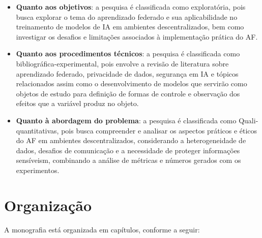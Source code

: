 \begin{itemize}
    \item \textbf{Quanto aos objetivos}: a pesquisa é classificada como exploratória, pois busca explorar o tema do aprendizado federado e sua aplicabilidade no treinamento de modelos de IA em ambientes descentralizados, bem como investigar os desafios e limitações associados à implementação prática do AF.
    \item \textbf{Quanto aos procedimentos técnicos}: a pesquisa é classificada como bibliográfica-experimental, pois envolve a revisão de literatura sobre aprendizado federado, privacidade de dados, segurança em IA e tópicos relacionados assim como o desenvolvimento de modelos que servirão como objetos de estudo para definição de formas de controle e observação dos efeitos que a variável produz no objeto.
    \item \textbf{Quanto à abordagem do problema}: a pesquisa é classificada como Quali-quantitativas, pois busca compreender e analisar os aspectos práticos e éticos do AF em ambientes descentralizados, considerando a heterogeneidade de dados, desafios de comunicação e a necessidade de proteger informações sensíveism, combinando a análise de métricas e números gerados com os experimentos.
\end{itemize}

\section{Organização}
\label{sec:organizacao}

A monografia está organizada em capítulos, conforme a seguir:

